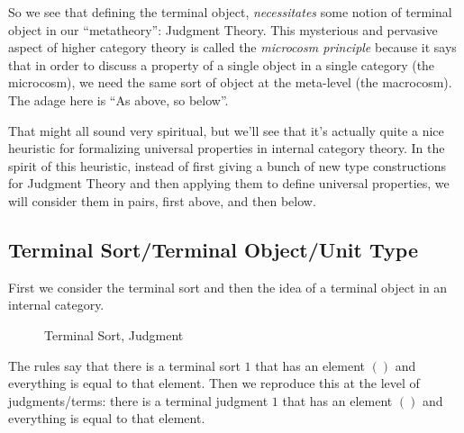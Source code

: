 \documentclass{article}
\begin{document}
So we see that defining the terminal object, \emph{necessitates} some
notion of terminal object in our ``metatheory'': Judgment Theory.
This mysterious and pervasive aspect of higher category theory is
called the \emph{microcosm principle} because it says that in order to
discuss a property of a single object in a single category (the
microcosm), we need the same sort of object at the meta-level (the
macrocosm).
The adage here is ``As above, so below''.

That might all sound very spiritual, but we'll see that it's actually
quite a nice heuristic for formalizing universal properties in
internal category theory.
In the spirit of this heuristic, instead of first giving a bunch of
new type constructions for Judgment Theory and then applying them to
define universal properties, we will consider them in pairs, first
above, and then below.

\subsection{Terminal Sort/Terminal Object/Unit Type}

First we consider the terminal sort and then the idea of a terminal
object in an internal category.

\begin{figure}
  \caption{Terminal Sort, Judgment}
\end{figure}

The rules say that there is a terminal sort $1$ that has an element
$()$ and everything is equal to that element.
Then we reproduce this at the level of judgments/terms: there is a
terminal judgment $1$ that has an element $()$ and everything is equal
to that element.
\end{document}
